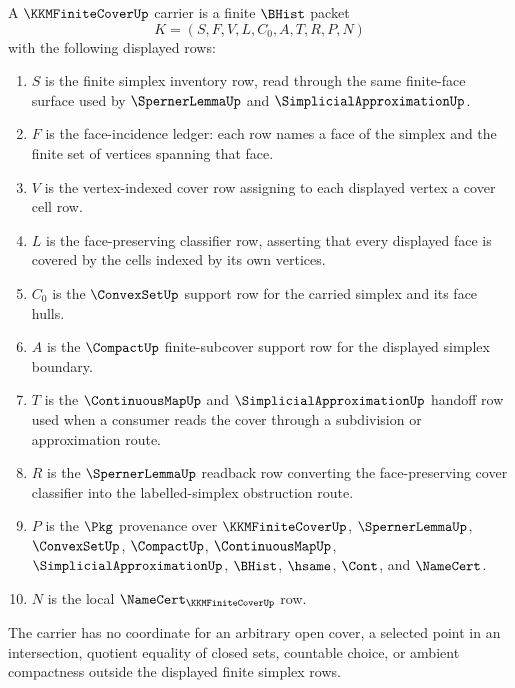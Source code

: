 \begin{definition}
\label{def:kkm-finite-cover-carrier}
A $\KKMFiniteCoverUp$ carrier is a finite $\BHist$ packet
$$
K=(S,F,V,L,C_0,A,T,R,P,N)
$$
with the following displayed rows:
\begin{enumerate}
  \item $S$ is the finite simplex inventory row, read through the same finite-face surface used by $\SpernerLemmaUp$ and $\SimplicialApproximationUp$.
  \item $F$ is the face-incidence ledger: each row names a face of the simplex and the finite set of vertices spanning that face.
  \item $V$ is the vertex-indexed cover row assigning to each displayed vertex a cover cell row.
  \item $L$ is the face-preserving classifier row, asserting that every displayed face is covered by the cells indexed by its own vertices.
  \item $C_0$ is the $\ConvexSetUp$ support row for the carried simplex and its face hulls.
  \item $A$ is the $\CompactUp$ finite-subcover support row for the displayed simplex boundary.
  \item $T$ is the $\ContinuousMapUp$ and $\SimplicialApproximationUp$ handoff row used when a consumer reads the cover through a subdivision or approximation route.
  \item $R$ is the $\SpernerLemmaUp$ readback row converting the face-preserving cover classifier into the labelled-simplex obstruction route.
  \item $P$ is the $\Pkg$ provenance over $\KKMFiniteCoverUp$, $\SpernerLemmaUp$, $\ConvexSetUp$, $\CompactUp$, $\ContinuousMapUp$, $\SimplicialApproximationUp$, $\BHist$, $\hsame$, $\Cont$, and $\NameCert$.
  \item $N$ is the local $\NameCert_{\KKMFiniteCoverUp}$ row.
\end{enumerate}
The carrier has no coordinate for an arbitrary open cover, a selected point in an intersection, quotient equality of closed sets, countable choice, or ambient compactness outside the displayed finite simplex rows.
\end{definition}

